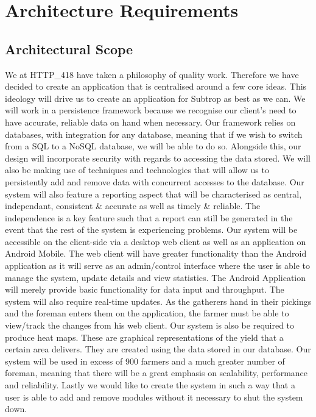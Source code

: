 \documentclass[11pt,fleqn]{book} %
\begin{document}
	\chapter{Architecture Requirements}
	
	\section{Architectural Scope}
		We at HTTP\_418 have taken a philosophy of quality work. Therefore we have decided to create an application that is centralised around a few core ideas. This ideology will drive us to create an application for Subtrop as best as we can.\newline
		We will work in a persistence framework because we recognise our client’s need to have accurate, reliable data on hand when necessary. Our framework relies on databases, with integration for any database, meaning that if we wish to switch from a SQL to a NoSQL database, we will be able to do so. Alongside this, our design will incorporate security with regards to accessing the data stored. We will also be making use of techniques and technologies that will allow us to persistently add and remove data with concurrent accesses to the database.\newline
		Our system will also feature a reporting aspect that will be characterised as central, independant, consistent \& accurate as well as timely \& reliable. The independence is a key feature such that a report can still be generated in the event that the rest of the system is experiencing problems.\newline
		Our system will be accessible on the client-side via a desktop web client as well as an application on Android Mobile. The web client will have greater functionality than the Android application as it will serve as an admin/control interface where the user is able to manage the system, update details and view statistics. The Android Application will merely provide basic functionality for data input and throughput.\newline
		The system will also require real-time updates. As the gatherers hand in their pickings and the foreman enters them on the application, the farmer must be able to view/track the changes from his web client.\newline
		Our system is also be required to produce heat maps. These are graphical representations of the yield that a certain area delivers. They are created using the data stored in our database.\newline
		Our system will be used in excess of 900 farmers and a much greater number of foreman, meaning that there will be a great emphasis on scalability, performance and reliability. \newline
		Lastly we would like to create the system in such a way that a user is able to add and remove modules without it necessary to shut the system down.\newline
\end{document}
